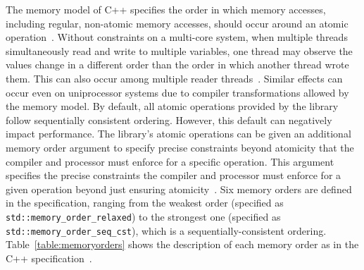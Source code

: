 The memory model of C++ specifies the order in which memory accesses, including regular, non-atomic memory accesses, should occur around an atomic operation~\cite{memoryOrderCpp2020}. Without constraints on a multi-core system, when multiple threads simultaneously read and write to multiple variables, one thread may observe the values change in a different order than the order in which another thread wrote them. This can also occur among multiple reader threads~\cite{memoryOrderCpp2020}. Similar effects can occur even on uniprocessor systems due to compiler transformations allowed by the memory model. By default, all atomic operations provided by the library follow sequentially consistent ordering. However, this default can negatively impact performance. The library's atomic operations can be given an additional memory order argument to specify precise constraints beyond atomicity that the compiler and processor must enforce for a specific operation. This argument specifies the precise constraints the compiler and processor must enforce for a given operation beyond just ensuring atomicity~\cite{memoryOrderCpp2020}. Six memory orders are defined in the specification, ranging from the weakest order (specified as \texttt{std::memory\_order\_relaxed}) to the strongest one (specified as \texttt{std::memory\_order\_seq\_cst}), which is a sequentially-consistent ordering. Table~\ref{table:memoryorders} shows the description of each memory order as in the C++ specification~\cite{memoryOrderCpp2020}.

